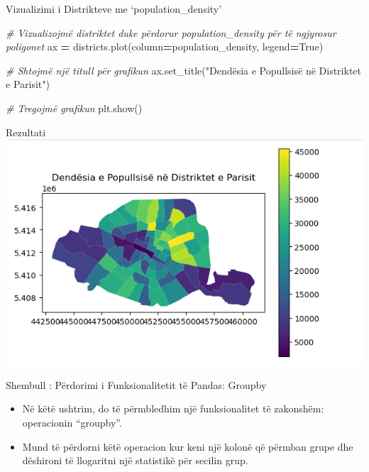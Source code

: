 \documentclass[
  ignorenonframetext,
]{beamer}
\newenvironment{Shaded}{\begin{snugshade}}{\end{snugshade}}
\newcommand{\CommentTok}[1]{\textcolor[rgb]{0.56,0.35,0.01}{\textit{#1}}}
\newcommand{\NormalTok}[1]{#1}
\newcommand{\OperatorTok}[1]{\textcolor[rgb]{0.81,0.36,0.00}{\textbf{#1}}}
\newcommand{\StringTok}[1]{\textcolor[rgb]{0.31,0.60,0.02}{#1}}
\newcommand{\VariableTok}[1]{\textcolor[rgb]{0.00,0.00,0.00}{#1}}
\begin{document}
\begin{frame}[fragile]{Vizualizimi i Distrikteve me
`population\_density'}
\protect\hypertarget{vizualizimi-i-distrikteve-me-population_density}{}

\begin{Shaded}
\begin{Highlighting}[]
\CommentTok{\# Vizualizojmë distriktet duke përdorur \textquotesingle{}population\_density\textquotesingle{} për të ngjyrosur poligonet}
\NormalTok{ax }\OperatorTok{=}\NormalTok{ districts.plot(column}\OperatorTok{=}\StringTok{\textquotesingle{}population\_density\textquotesingle{}}\NormalTok{, legend}\OperatorTok{=}\VariableTok{True}\NormalTok{)}

\CommentTok{\# Shtojmë një titull për grafikun}
\NormalTok{ax.set\_title(}\StringTok{"Dendësia e Popullsisë në Distriktet e Parisit"}\NormalTok{)}

\CommentTok{\# Tregojmë grafikun}
\NormalTok{plt.show()}
\end{Highlighting}
\end{Shaded}
\end{frame}

\begin{frame}{Rezultati}
\protect\hypertarget{rezultati}{}
\includegraphics{./Figs/popdist.png}
\end{frame}

\begin{frame}{Shembull : Përdorimi i Funksionalitetit të Pandas:
Groupby}
\protect\hypertarget{shembull-puxebrdorimi-i-funksionalitetit-tuxeb-pandas-groupby}{}
\begin{itemize}
\item
  Në këtë ushtrim, do të përmbledhim një funksionalitet të zakonshëm:
  operacionin ``groupby''.
\item
  Mund të përdorni këtë operacion kur keni një kolonë që përmban grupe
  dhe dëshironi të llogaritni një statistikë për secilin grup.
\end{itemize}
\end{frame}
\end{document}
